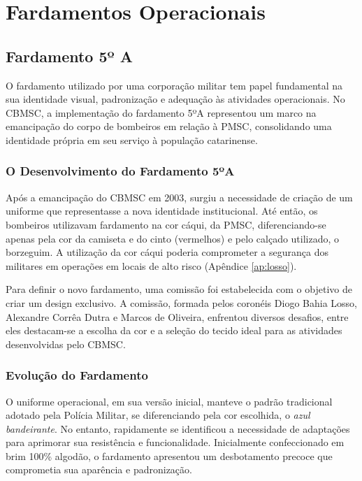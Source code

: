 \chapter{Fardamentos Operacionais}

\section{Fardamento 5º A}

O fardamento utilizado por uma corporação militar tem papel fundamental na sua identidade visual, 
padronização e adequação às atividades operacionais. No \acrfull{CBMSC}, a implementação do 
fardamento 5ºA representou um marco na emancipação do corpo de bombeiros em relação à \acrfull{PMSC}, 
consolidando uma identidade própria em seu serviço à população catarinense.

\subsection{O Desenvolvimento do Fardamento 5ºA}

Após a emancipação do \acrshort{CBMSC} em 2003, surgiu a necessidade de criação de um uniforme que 
representasse a nova identidade institucional. Até então, os bombeiros utilizavam fardamento na 
cor cáqui, da \acrshort{PMSC}, diferenciando-se apenas pela cor da camiseta e do cinto (vermelhos) 
e pelo calçado utilizado, o borzeguim. A utilização da cor cáqui poderia comprometer a segurança dos
 militares em operações em locais de alto risco (Apêndice \ref{ap:losso}).

Para definir o novo fardamento, uma comissão foi estabelecida com o objetivo de criar um design 
exclusivo. A comissão, formada pelos coronéis Diogo Bahia Losso, Alexandre Corrêa Dutra e Marcos
 de Oliveira, enfrentou diversos desafios, entre eles destacam-se a escolha da cor e a seleção 
 do tecido ideal para as atividades desenvolvidas pelo \acrshort{CBMSC}.

\subsection{Evolução do Fardamento}

O uniforme operacional, em sua versão inicial, manteve o padrão tradicional adotado pela Polícia 
Militar, se diferenciando pela cor escolhida, o \textit{azul bandeirante}. No entanto, rapidamente 
se identificou a necessidade de adaptações para aprimorar sua resistência e funcionalidade. 
Inicialmente confeccionado em brim 100\% algodão, o fardamento apresentou um desbotamento precoce
 que comprometia sua aparência e padronização.

